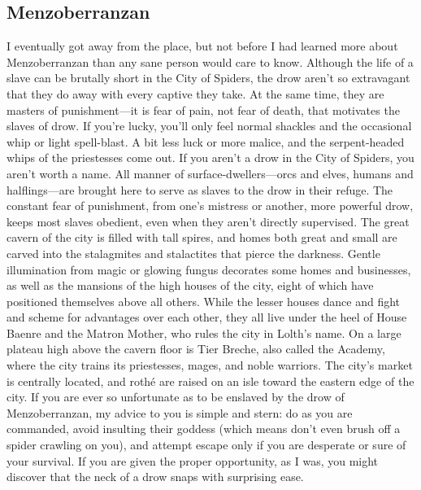 \documentclass[10pt,a4paper,twoside,twocolumn,openany,bg=print,nodeprecatedcode]{dndbook}
\begin{document}
\subsection{Menzoberranzan}
I eventually got away from the place, but not before I had learned more about Menzoberranzan than any sane person would care to know. Although the life of a slave can be brutally short in the City of Spiders, the drow aren't so extravagant that they do away with every captive they take. At the same time, they are masters of punishment—it is fear of pain, not fear of death, that motivates the slaves of drow. If you're lucky, you'll only feel normal shackles and the occasional whip or light spell-blast. A bit less luck or more malice, and the serpent-headed whips of the priestesses come out.
If you aren't a drow in the City of Spiders, you aren't worth a name. All manner of surface-dwellers—orcs and elves, humans and halflings—are brought here to serve as slaves to the drow in their refuge. The constant fear of punishment, from one's mistress or another, more powerful drow, keeps most slaves obedient, even when they aren't directly supervised.
The great cavern of the city is filled with tall spires, and homes both great and small are carved into the stalagmites and stalactites that pierce the darkness. Gentle illumination from magic or glowing fungus decorates some homes and businesses, as well as the mansions of the high houses of the city, eight of which have positioned themselves above all others. While the lesser houses dance and fight and scheme for advantages over each other, they all live under the heel of House Baenre and the Matron Mother, who rules the city in Lolth's name.
On a large plateau high above the cavern floor is Tier Breche, also called the Academy, where the city trains its priestesses, mages, and noble warriors. The city's market is centrally located, and rothé are raised on an isle toward the eastern edge of the city.
If you are ever so unfortunate as to be enslaved by the drow of Menzoberranzan, my advice to you is simple and stern: do as you are commanded, avoid insulting their goddess (which means don't even brush off a spider crawling on you), and attempt escape only if you are desperate or sure of your survival. If you are given the proper opportunity, as I was, you might discover that the neck of a drow snaps with surprising ease.
\end{document}
